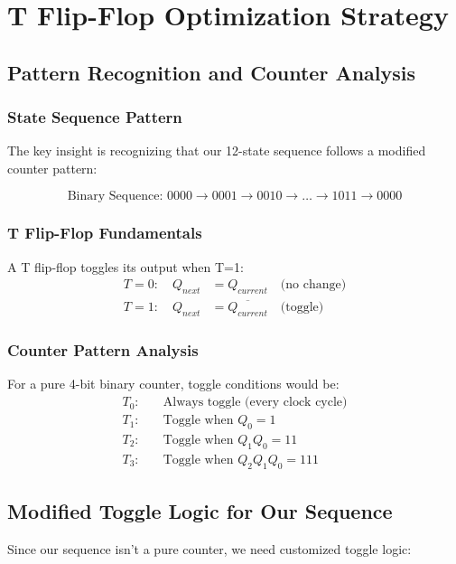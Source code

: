 \documentclass[12pt,letterpaper]{article}
\begin{document}
\newpage

\section{T Flip-Flop Optimization Strategy}

\subsection{Pattern Recognition and Counter Analysis}

\subsubsection{State Sequence Pattern}
The key insight is recognizing that our 12-state sequence follows a modified counter pattern:

\begin{equation}
\text{Binary Sequence: } 0000 \rightarrow 0001 \rightarrow 0010 \rightarrow \ldots \rightarrow 1011 \rightarrow 0000
\end{equation}

\subsubsection{T Flip-Flop Fundamentals}
A T flip-flop toggles its output when T=1:
\begin{align}
T = 0: \quad Q_{next} &= Q_{current} \quad \text{(no change)} \\
T = 1: \quad Q_{next} &= \overline{Q_{current}} \quad \text{(toggle)}
\end{align}

\subsubsection{Counter Pattern Analysis}
For a pure 4-bit binary counter, toggle conditions would be:
\begin{align}
T_0: &\quad \text{Always toggle (every clock cycle)} \\
T_1: &\quad \text{Toggle when } Q_0 = 1 \\
T_2: &\quad \text{Toggle when } Q_1Q_0 = 11 \\
T_3: &\quad \text{Toggle when } Q_2Q_1Q_0 = 111
\end{align}

\subsection{Modified Toggle Logic for Our Sequence}
Since our sequence isn't a pure counter, we need customized toggle logic:
\end{document}
